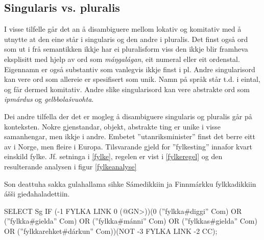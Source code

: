\documentclass[a4paper,norsk]{article}
\begin{document}
\subsection{Singularis vs. pluralis}

I visse tilfelle  går det an å disambiguere mellom lokativ og komitativ med å utnytte at den eine står i singularis og den andre i pluralis. %
Det finst også ord som ut i frå semantikken ikkje har ei pluralisform viss den ikkje blir framheva eksplisitt med hjelp av ord som \textit{máŋgalágan}, eit numeral eller eit ordenstal. Eigennamn er også substantiv som vanlegvis ikkje finst i pl. Andre singularisord kan vere ord som allereie er spesifisert som unik. Namn på språk står t.d. i eintal, og får dermed komitativ. Andre slike singularisord kan vere abstrakte ord som \textit{ipmárdus} og \textit{gelbbolašvuohta}. %

Dei andre tilfella der det er mogleg å disambiguere singularis og pluralis går på konteksten. Nokre gjenstandar, objekt, abstrakte ting er unike i visse samanhengar, men ikkje i andre. Embetet ''utanriksminister'' finst det berre eitt av i Norge, men fleire i Europa. Tilsvarande gjeld for ''fylkesting'' innafor kvart einskild fylke. Jf. setninga i \ref{fylke}, regelen er vist i \ref{fylkeregel} og den resulterande analysen i figur \ref{fylkeanalyse} %

\begin{example}\label{fylke}
Son deattuha sakka gulahallama sihke Sámedikkiin ja Finnmárkku fylkkadikkiin ášši gieđahaladettiin.
\end{example}

\begin{example}\label{fylkeregel}
SELECT Sg IF (-1 FYLKA LINK 0 (@GN>))(0 (''fylkka\#diggi'' Com) OR (''fylkka\#gielda'' Com) OR (''fylkka\#mánni'' Com) OR (''fylkkas\#gielda'' Com) OR (''fylkkarehket\#dárkun'' Com))(NOT -3 FYLKA LINK -2 CC);
\end{example}
\end{document}
